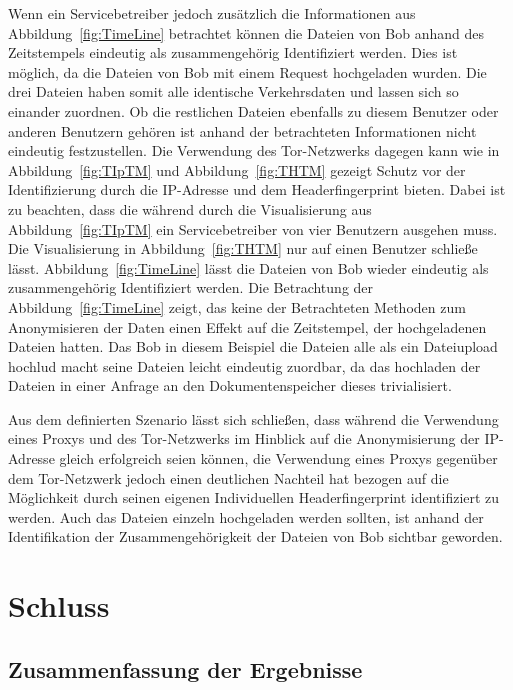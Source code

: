 \documentclass[
    fontsize=12pt,
    headings=small,
    parskip=half,           %
    bibliography=totoc,
    numbers=noenddot,       %
    open=any,               %
    ]{scrreprt}
\begin{document}
Wenn ein Servicebetreiber jedoch zusätzlich die Informationen aus Abbildung~\ref{fig:TimeLine} betrachtet können die Dateien von Bob anhand des Zeitstempels eindeutig als zusammengehörig Identifiziert werden.
Dies ist möglich, da die Dateien von Bob mit einem Request hochgeladen wurden.
Die drei Dateien haben somit alle identische Verkehrsdaten und lassen sich so einander zuordnen.
Ob die restlichen Dateien ebenfalls zu diesem Benutzer oder anderen Benutzern gehören ist anhand der betrachteten Informationen nicht eindeutig festzustellen.
Die Verwendung des Tor-Netzwerks dagegen kann wie in Abbildung~\ref{fig:TIpTM} und Abbildung~\ref{fig:THTM} gezeigt Schutz vor der Identifizierung durch die IP-Adresse und dem Headerfingerprint bieten.
Dabei ist zu beachten, dass die während durch die Visualisierung aus Abbildung~\ref{fig:TIpTM} ein Servicebetreiber von vier Benutzern ausgehen muss.
Die Visualisierung in Abbildung~\ref{fig:THTM} nur auf einen Benutzer schließe lässt.
Abbildung~\ref{fig:TimeLine} lässt die Dateien von Bob wieder eindeutig als zusammengehörig Identifiziert werden.
Die Betrachtung der Abbildung~\ref{fig:TimeLine} zeigt, das keine der Betrachteten Methoden zum Anonymisieren der Daten einen Effekt auf die Zeitstempel, der hochgeladenen Dateien hatten.
Das Bob in diesem Beispiel die Dateien alle als ein Dateiupload hochlud macht seine Dateien leicht eindeutig zuordbar, da das hochladen der Dateien in einer Anfrage an den Dokumentenspeicher dieses trivialisiert.

Aus dem definierten Szenario lässt sich schließen, dass während die Verwendung eines Proxys und des Tor-Netzwerks im Hinblick auf die Anonymisierung der IP-Adresse gleich erfolgreich seien können, die Verwendung eines Proxys gegenüber dem Tor-Netzwerk jedoch einen deutlichen Nachteil hat bezogen auf die Möglichkeit durch seinen eigenen Individuellen Headerfingerprint identifiziert zu werden.
Auch das Dateien einzeln hochgeladen werden sollten, ist anhand der Identifikation der Zusammengehörigkeit der Dateien von Bob sichtbar geworden. 

\chapter{Schluss}
\section{Zusammenfassung der Ergebnisse}
\end{document}
